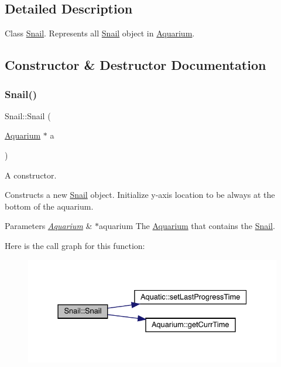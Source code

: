 \subsection{Detailed Description}
Class \mbox{\hyperlink{class_snail}{Snail}}. Represents all \mbox{\hyperlink{class_snail}{Snail}} object in \mbox{\hyperlink{class_aquarium}{Aquarium}}. 

\subsection{Constructor \& Destructor Documentation}
\mbox{\label{class_snail_af1c67c62983a1278d5a3ac6006de6990}} 
\subsubsection{\texorpdfstring{Snail()}{Snail()}}
{\footnotesize\ttfamily Snail\+::\+Snail (\begin{DoxyParamCaption}\item[{\mbox{\hyperlink{class_aquarium}{Aquarium}} $\ast$}]{a }\end{DoxyParamCaption})}



A constructor. 

Constructs a new \mbox{\hyperlink{class_snail}{Snail}} object. Initialize y-\/axis location to be always at the bottom of the aquarium. 
\begin{DoxyParams}{Parameters}
{\em \mbox{\hyperlink{class_aquarium}{Aquarium}}} & $\ast$aquarium The \mbox{\hyperlink{class_aquarium}{Aquarium}} that contains the \mbox{\hyperlink{class_snail}{Snail}}. \\
\hline
\end{DoxyParams}
Here is the call graph for this function\+:\nopagebreak
\begin{figure}[H]
\begin{center}
\leavevmode
\includegraphics[width=331pt]{class_snail_af1c67c62983a1278d5a3ac6006de6990_cgraph}
\end{center}
\end{figure}


